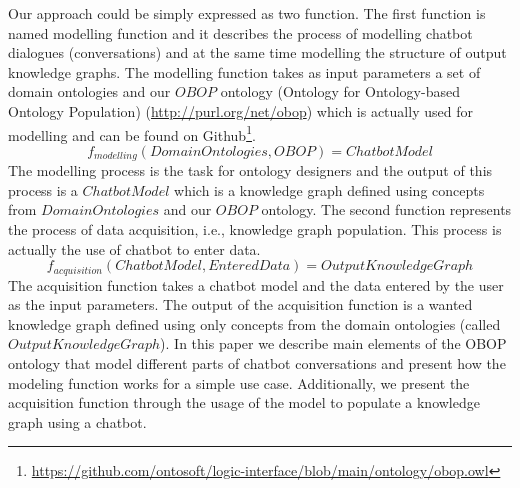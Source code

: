 \documentclass[runningheads]{llncs}
\begin{document}
Our approach could be simply expressed as two function. The first function is named modelling function and it describes the process of modelling chatbot dialogues (conversations) and at the same time modelling the structure of output knowledge graphs. The modelling function takes as input parameters a set of domain ontologies and our $OBOP$ ontology (Ontology for Ontology-based Ontology Population) (\url{http://purl.org/net/obop}) which is actually used for modelling and can be found on Github\footnote{\url{https://github.com/ontosoft/logic-interface/blob/main/ontology/obop.owl}}.
$$ f_{modelling}(DomainOntologies, OBOP) = ChatbotModel$$
The modelling process is the task for ontology designers and the output of this process is a $ChatbotModel$ which is a knowledge graph defined using concepts from $DomainOntologies$ and our $OBOP$ ontology. 
The second function represents the process of data acquisition, i.e., knowledge graph population. This process is actually the use of chatbot to enter data.
$$f_{acquisition}(ChatbotModel, EnteredData) = OutputKnowledgeGraph$$
The acquisition function takes a chatbot model and the data entered by the user as the input parameters. The output of the acquisition function is a wanted knowledge graph defined using only concepts from the domain ontologies (called $OutputKnowledgeGraph$). In this paper we describe main elements of the OBOP ontology that model different parts of chatbot conversations and present how the modeling function works for a simple use case. Additionally, we present the acquisition function through the usage of the model to populate a knowledge graph using a chatbot.      
\end{document}
